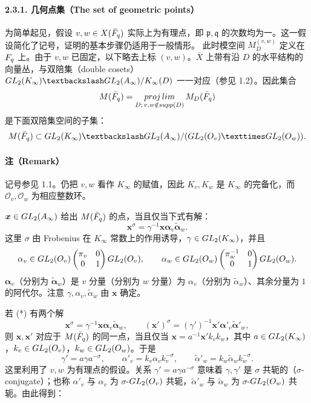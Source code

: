\paragraph*{2.3.1. 几何点集（The set of geometric points）}
为简单起见，假设 $v,w\in X(\bar{F}_q)$ 实际上为有理点，即 $\mathfrak p,\mathfrak q$ 的次数均为一。这一假设简化了记号，证明的基本步骤仍适用于一般情形。
此时模空间 $M_D^{(v,w)}$ 定义在 $F_q$ 上。由于 $v,w$ 已固定，以下略去上标 $(v,w)$。$\bar X$ 上带有沿 $D$ 的水平结构的向量丛，与双陪集（double cosets）
$\GL_2(K_\infty)\backslash\GL_2(A_\infty)/\mathcal K_\infty(D)$ 一一对应（参见 1.2）。因此集合
\[
M(\bar{F}_q)=\mathop{proj\,lim}_{D;\,v,w\notin supp(D)}M_D(\bar{F}_q)
\]
是下面双陪集空间的子集：
\[
M(\bar\F_q)\subset
\GL_2(K_\infty)\backslash\GL_2(A_\infty)/(\GL_2(\mathcal O_v)\times\GL_2(\mathcal O_w)).
\]
\paragraph*{注（Remark）}
记号参见 1.1。仍把 $v,w$ 看作 $K_\infty$ 的赋值，因此 $K_v,K_w$ 是 $K_\infty$ 的完备化，而 $\mathcal O_v,\mathcal O_w$ 为相应整数环。

$\boldsymbol x\in GL_2(A_\infty)$ 给出 $M(\bar{F}_q)$ 的点，当且仅当下式有解：
\[
\boldsymbol x^\sigma=\gamma^{-1}\boldsymbol x\boldsymbol\alpha_v
\widetilde{\boldsymbol\alpha}_w.\tag{*}
\]
这里 $\sigma$ 由 Frobenius 在 $K_\infty$ 常数上的作用诱导，$\gamma\in GL_2(K_\infty)$，并且
\[
\alpha_v\in GL_2(O_v)\begin{pmatrix}\pi_v&0\\0&1\end{pmatrix}GL_2(O_v),
\qquad
\alpha_w\in GL_2(O_w)\begin{pmatrix}\pi_w^{-1}&0\\0&1\end{pmatrix}GL_2(O_w).
\]
$\boldsymbol\alpha_v$（分别为 $\widetilde{\boldsymbol\alpha}_w$）是 $v$ 分量（分别为 $w$ 分量）为 $\alpha_v$（分别为 $\widetilde\alpha_w$）、其余分量为 $1$ 的阿代尔。注意 $\gamma,\alpha_v,\widetilde\alpha_w$ 由 $\boldsymbol x$ 确定。

若 (*) 有两个解
\[
\boldsymbol x^\sigma=\gamma^{-1}\boldsymbol x\boldsymbol\alpha_v\widetilde{\boldsymbol\alpha}_w,
\qquad
(\boldsymbol x')^\sigma=(\gamma')^{-1}\boldsymbol x'\boldsymbol\alpha'_v
\widetilde{\boldsymbol\alpha}'_w,
\]
则 $\boldsymbol x,\boldsymbol x'$ 对应于 $M(\bar{F}_q)$ 的同一点，当且仅当
$\boldsymbol x=a^{-1}\boldsymbol x'k_vk_w$，其中
$a\in GL_2(K_\infty)$，$k_v\in GL_2(O_v)$，$k_w\in GL_2(O_w)$。于是
\[
\gamma'=a\gamma a^{-\sigma},\qquad
\alpha'_v=k_v\alpha_vk_v^{-\sigma},\qquad
\widetilde\alpha'_w=k_w\widetilde\alpha_wk_w^{-\sigma}.
\]
这里利用了 $v,w$ 为有理点的假设。关系 $\gamma'=a\gamma a^{-\sigma}$ 意味着 $\gamma,\gamma'$ 是 $\sigma$ 共轭的（$\sigma$-conjugate）；也称 $\alpha'_v$ 与 $\alpha_v$ 为 $\sigma$-$GL_2(O_v)$ 共轭，$\widetilde\alpha'_w$ 与 $\widetilde\alpha_w$ 为 $\sigma$-$GL_2(O_w)$ 共轭。由此得到：

